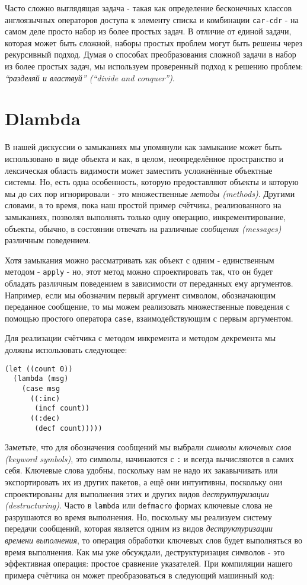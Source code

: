 Часто сложно выглядящая задача - такая как определение бесконечных классов англоязычных операторов доступа к элементу списка и комбинации \verb"car-cdr" - на самом деле просто набор из более простых задач. В отличие от единой задачи, которая может быть сложной, наборы простых проблем могут быть решены через рекурсивный подход. Думая о способах преобразования сложной задачи в набор из более простых задач, мы используем проверенный подход к решению проблем: \emph{``разделяй и властвуй'' (``divide and conquer'')}.

\section{Dlambda}\label{section_dlambda}

В нашей дискуссии о замыканиях мы упомянули как замыкание может быть использовано в виде объекта и как, в целом, неопределённое пространство и лексическая область видимости может заместить усложнённые объектные системы. Но, есть одна особенность, которую предоставляют объекты и которую мы до сих пор игнорировали - это множественные \emph{методы (methods)}. Другими словами, в то время, пока наш простой пример счётчика, реализованного на замыканиях, позволял выполнять только одну операцию, инкрементирование, объекты, обычно, в состоянии отвечать на различные \emph{сообщения (messages)} различным поведением.

Хотя замыкания можно рассматривать как объект с одним - единственным методом - \verb"apply" - но, этот метод можно спроектировать так, что он будет обладать различным поведением в зависимости от переданных ему аргументов. Например, если мы обозначим первый аргумент символом, обозначающим переданное сообщение, то мы можем реализовать множественные поведения с помощью простого оператора \verb"case", взаимодействующим с первым аргументом.

Для реализации счётчика с методом инкремента и методом декремента мы должны использовать следующее:

\begin{verbatim}
(let ((count 0))
  (lambda (msg)
    (case msg
      ((:inc)
       (incf count))
      ((:dec)
       (decf count)))))
\end{verbatim}

Заметьте, что для обозначения сообщений мы выбрали \emph{символы ключевых слов (keyword symbols)}, это символы, начинаются с \verb":" и всегда вычисляются в самих себя. Ключевые слова удобны, поскольку нам не надо их закавычивать или экспортировать их из других пакетов, а ещё они интуитивны, поскольку они спроектированы для выполнения этих и других видов \emph{деструктуризации (destructuring)}. Часто в \verb"lambda" или \verb"defmacro" формах ключевые слова не разрушаются во время выполнения. Но, поскольку мы реализуем систему передачи сообщений, которая является одним из видов \emph{деструктуризации времени выполнения}, то операция обработки ключевых слов будет выполняться во время выполнения. Как мы уже обсуждали, деструктуризация символов - это эффективная операция: простое сравнение указателей. При компиляции нашего примера счётчика он может преобразоваться в следующий машинный код:

